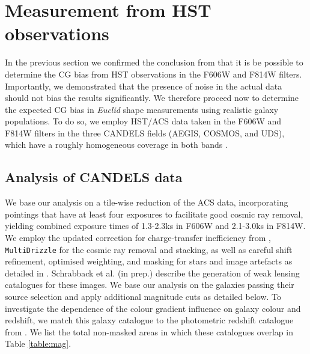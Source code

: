 \documentclass[useAMS,usenatbib]{mnras}
\begin{document}
\section{Measurement from HST observations}
\label{sec:candels}

In the previous section we confirmed the conclusion from  
that it is be possible to determine the CG bias from HST observations in the F606W 
and F814W filters. Importantly, we demonstrated that the presence of noise in the 
actual data should not bias the results significantly. We therefore proceed now to
determine the expected CG bias in {\it Euclid} shape measurements using
 realistic galaxy populations. To do so, we employ HST/ACS data taken in the F606W and F814W
filters in the three CANDELS fields (AEGIS, COSMOS, and UDS), which have
a roughly homogeneous coverage in both bands \citep[see][]{davis2007,grogin2011,Koekemoer11}.

\subsection{Analysis of CANDELS data}

We base our analysis on a tile-wise reduction of the ACS data, incorporating pointings
that have at least four exposures to facilitate good cosmic ray
removal, yielding combined exposure times of 1.3-2.3ks in F606W and
2.1-3.0ks in F814W.  We employ the updated correction for
charge-transfer inefficiency from \cite{massey2014},
\texttt{MultiDrizzle} \citep{koekemoer2003} for the cosmic ray removal
and stacking, as well as careful shift refinement, optimised
weighting, and masking for stars and image artefacts as detailed in
\cite{schrabback2010}.  Schrabback et al. (in prep.) describe the
generation of weak lensing catalogues for these images.  We base our
analysis on the galaxies passing their source selection and apply
additional magnitude cuts as detailed below. To investigate the
dependence of the colour gradient influence on galaxy colour and
redshift, we match this galaxy catalogue to the photometric redshift
catalogue from \cite{skelton14}.  We list the total non-masked areas
in which these catalogues overlap in Table \ref{table:mag}.
\end{document}

